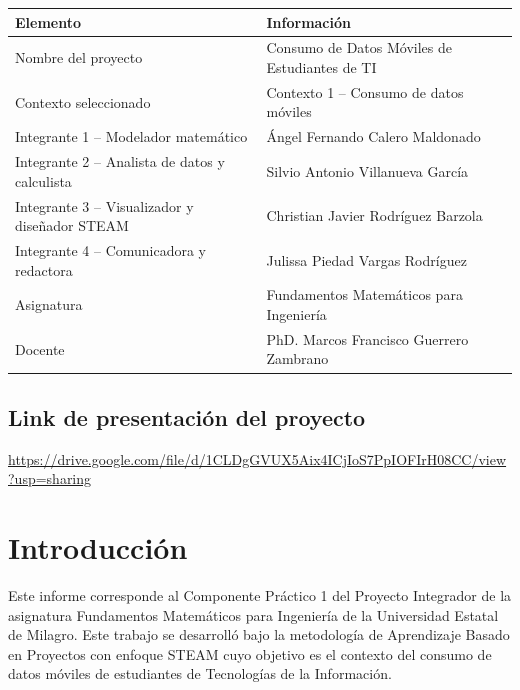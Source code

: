 \documentclass[12pt,a4paper]{article}
\begin{document}
	\begin{table}[H]
		\centering
		\renewcommand{\arraystretch}{1.4}
		\begin{tabular}{|p{6cm}|p{8cm}|}
			\hline
			\rowcolor{azulclaro}
			\textbf{Elemento} & \textbf{Información} \\ \hline
			Nombre del proyecto & Consumo de Datos Móviles de Estudiantes de TI \\ \hline
			Contexto seleccionado & Contexto 1 -- Consumo de datos móviles \\ \hline
			Integrante 1 -- Modelador matemático & Ángel Fernando Calero Maldonado \\ \hline
			Integrante 2 -- Analista de datos y calculista & Silvio Antonio Villanueva García \\ \hline
			Integrante 3 -- Visualizador y diseñador STEAM & Christian Javier Rodríguez Barzola \\ \hline
			Integrante 4 -- Comunicadora y redactora & Julissa Piedad Vargas Rodríguez \\ \hline
			Asignatura & Fundamentos Matemáticos para Ingeniería \\ \hline
			Docente & PhD. Marcos Francisco Guerrero Zambrano \\ \hline
		\end{tabular}
	\end{table}
	
	\vspace{1.5cm}
	\subsection*{\Large \color {red} Link de presentación del proyecto}
	
	\url {https://drive.google.com/file/d/1CLDgGVUX5Aix4ICjIoS7PpIOFIrH08CC/view?usp=sharing}
	
	
	\newpage
	
	\tableofcontents
	\newpage
	
	\section{Introducción}
	
	Este informe corresponde al Componente Práctico 1 del Proyecto Integrador de la asignatura Fundamentos Matemáticos para Ingeniería de la Universidad Estatal de Milagro. Este trabajo se desarrolló  bajo la metodología de Aprendizaje Basado en Proyectos con enfoque STEAM cuyo objetivo es el contexto del consumo de datos móviles de estudiantes de Tecnologías de la Información.
	
\end{document}
